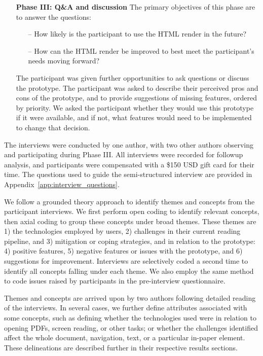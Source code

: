 \begin{itemize}[itemsep=5pt]
    \item[] \textbf{Phase III: Q\&A and discussion} \newline 
    The primary objectives of this phase are to answer the questions:
    \begin{itemize}[noitemsep, leftmargin=0.4in]
        \item[--] How likely is the participant to use the HTML render in the future?
        \item[--] How can the HTML render be improved to best meet the participant's needs moving forward?
    \end{itemize}
    The participant was given further opportunities to ask questions or discuss the prototype. The participant was asked to describe their perceived pros and cons of the prototype, and to provide suggestions of missing features, ordered by priority. We asked the participant whether they would use this prototype if it were available, and if not, what features would need to be implemented to change that decision. 
\end{itemize}

\noindent The interviews were conducted by one author, with two other authors observing and participating during Phase III. All interviews were recorded for followup analysis, and participants were compensated with a \$150 USD gift card for their time. The questions used to guide the semi-structured interview are provided in Appendix~\ref{app:interview_questions}. 

We follow a grounded theory approach to identify themes and concepts from the participant interviews. We first perform open coding to identify relevant concepts, then axial coding to group these concepts under broad themes. These themes are 1) the technologies employed by users, 2) challenges in their current reading pipeline, and 3) mitigation or coping strategies, and in relation to the \scially prototype: 4) positive features, 5) negative features or issues with the prototype, and 6) suggestions for improvement. 
Interviews are selectively coded a second time to identify all concepts falling under each theme. We also employ the same method to code issues raised by participants in the pre-interview questionnaire. 

Themes and concepts are arrived upon by two authors following detailed reading of the interviews. In several cases, we further define attributes associated with some concepts, such as defining whether the technologies used were in relation to opening PDFs, screen reading, or other tasks; or whether the challenges identified affect the whole document, navigation, text, or a particular in-paper element. These delineations are described further in their respective results sections.

